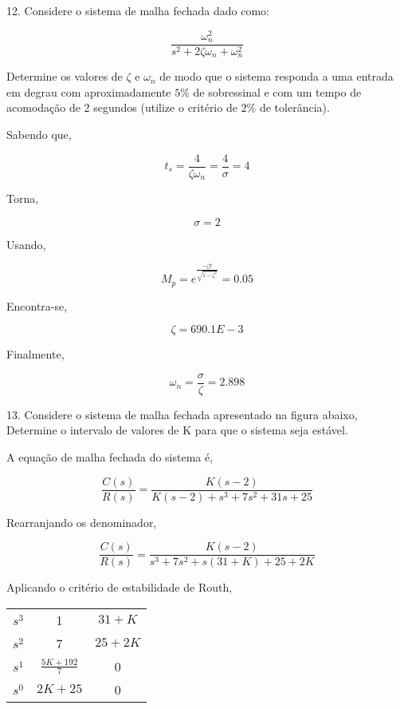\documentclass[paper=a4, fontsize=11pt]{article}
\begin{document}
\newpage

12. Considere o sistema de malha fechada dado como:

$$
\frac{\omega_n^2}{s^2 + 2 \zeta \omega_n + \omega_n^2}
$$

Determine os valores de $\zeta$ e $\omega_n$ de modo que o sistema responda a uma entrada em degrau
com aproximadamente $5\%$ de sobressinal e com um tempo de acomodação de 2 segundos
(utilize o critério de $2\%$ de tolerância).

Sabendo que,

$$
t_s = \frac{4}{\zeta \omega_n} = \frac{4}{\sigma} = 4
$$

Torna,

$$
\sigma = 2
$$

Usando,

$$
M_p = e^{\frac{-\zeta \pi}{\sqrt{1-\zeta^2}} } = 0.05
$$

Encontra-se,

$$
\zeta = 690.1E-3
$$

Finalmente,

$$
\omega_n = \frac{\sigma}{\zeta} = 2.898
$$

\newpage

13. Considere o sistema de malha fechada apresentado na figura abaixo,
Determine o intervalo de valores de K para que o sistema seja estável.

A equação de malha fechada do sistema é,

$$
\frac{C(s)}{R(s)} = \frac{K (s-2)}{K (s-2) + s^3 + 7 s^2 + 31 s + 25}
$$

Rearranjando os denominador,

$$
\frac{C(s)}{R(s)} = \frac{K (s-2)}{s^3 + 7 s^2 + s(31 + K) + 25 + 2K} 
$$

Aplicando o critério de estabilidade de Routh,

\begin{center}
    \begin{tabular}{c| c c}
        $s^3$ & 1 & $31+K$ \\
        $s^2$ & 7 & $25+2K$ \\
        $s^1$ & $\frac{5K+192}{7}$ & 0 \\
        $s^0$ & $2K+25$ & 0 \\
    \end{tabular}
\end{center}
\end{document}
